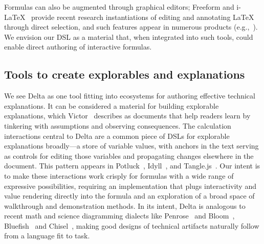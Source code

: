 Formulas can also be augmented through graphical editors; Freeform \cite{tao2025freeform} and i-LaTeX~\cite{ref:gobert2022ilatex} provide recent research instantiations of editing and annotating LaTeX through direct selection, and such features appear in numerous products (e.g.,~\cite{microsoft_equation_editor,Topping1999UsingMT,tool:mathcha}). We envision our DSL as a material that, when integrated into such tools, could enable direct authoring of interactive formulas.

\subsection{Tools to create explorables and explanations}

We see Delta as one tool fitting into ecosystems for authoring effective technical explanations. It can be considered a material for building explorable explanations, which Victor~\cite{victor2011explorable} describes as documents that help readers learn by tinkering with assumptions and observing consequences. The calculation interactions central to Delta are a common piece of DSLs for explorable explanations broadly---a store of variable values, with anchors in the text serving as controls for editing those variables and propagating changes elsewhere in the document. This pattern appears in Potluck~\cite{potluck2022}, Idyll~\cite{ref:conlen2018idyll}, and Tangle.js~\cite{tangle2011}. Our intent is to make these interactions work crisply for formulas with a wide range of expressive possibilities, requiring an implementation that plugs interactivity and value rendering directly into the formula and an exploration of a broad space of walkthrough and demonstration methods. In its intent, Delta is analogous to recent math and science diagramming dialects like Penrose~\cite{ref:ye2020penrose} and Bloom~\cite{Teller2025-pw}, Bluefish~\cite{ref:pollock2022bluefish} and Chisel~\cite{chisel}, making good designs of technical artifacts naturally follow from a language fit to task.
